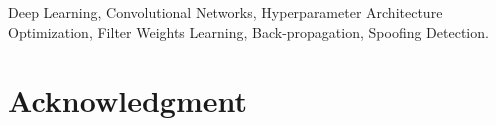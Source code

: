 \documentclass[journal]{IEEEtran}
\begin{document}
\begin{abstract}
\end{abstract}

\begin{IEEEkeywords}
Deep Learning, Convolutional Networks, Hyperparameter Architecture Optimization, Filter Weights Learning, Back-propagation, Spoofing Detection.
\end{IEEEkeywords}

%
\IEEEpeerreviewmaketitle


 





\section*{Acknowledgment}
\end{document}
